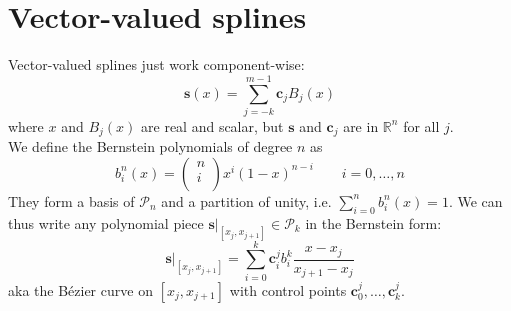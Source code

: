 \documentclass[12pt, openany]{report}
\newcommand{\R}{\mathbb{R}}
\theoremstyle{definition}
\begin{document}
\section{Vector-valued splines}
Vector-valued splines just work component-wise:
\begin{equation}
    \textbf{s}(x) = \sum_{j=-k}^{m-1}\textbf{c}_jB_j(x)
\end{equation}
where $x$ and $B_j(x)$ are real and scalar, but $\textbf{s}$ and $\textbf{c}_j$ are in $\R^n$ for all $j$.\\
We define the Bernstein polynomials of degree $n$ as 
\begin{equation}
    b_i^n(x) = \begin{pmatrix}
        n\\i\\
    \end{pmatrix} x^i(1-x)^{n-i}\qquad i=0,\dots,n
\end{equation}
They form a basis of $\mathcal{P}_n$ and a partition of unity, i.e. $\sum_{i=0}^nb_i^n(x) = 1$. We can thus write any polynomial piece $\textbf{s}|_{[x_j,x_{j+1}]}\in \mathcal{P}_k$ in the Bernstein form:
\begin{equation}
    \textbf{s}|_{[x_j,x_{j+1}]} = \sum_{i=0}^k\textbf{c}_i^jb_i^k\frac{x-x_j}{x_{j+1}-x_j}
\end{equation}
aka the B\'ezier curve on $[x_j,x_{j+1}]$ with control points $\textbf{c}_0^j,\dots, \textbf{c}_k^j$.
\end{document}
